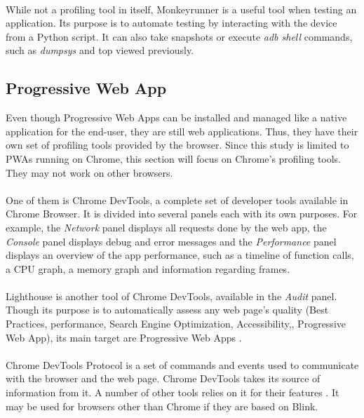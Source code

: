 \documentclass{kththesis}
\begin{document}
\paragraph{}
While not a profiling tool in itself, Monkeyrunner \cite{monkeyrunner} is a useful tool when testing an application. Its purpose is to automate testing by interacting with the device from a Python script. It can also take snapshots or execute \textit{adb shell} commands, such as \textit{dumpsys} and top viewed previously. 

\subsection{Progressive Web App}

Even though Progressive Web Apps can be installed and managed like a native application for the end-user, they are still web applications. Thus, they have their own set of profiling tools provided by the browser. Since this study is limited to PWAs running on Chrome, this section will focus on Chrome's profiling tools. They may not work on other browsers.

\paragraph{}
One of them is Chrome DevTools, a complete set of developer tools available in Chrome Browser. It is divided into several panels each with its own purposes. For example, the \textit{Network} panel displays all requests done by the web app, the \textit{Console} panel displays debug and error messages and the \textit{Performance} panel \cite{chrome_devtools_perf} displays an overview of the app performance, such as a timeline of function calls, a CPU graph, a memory graph and information regarding frames. 

\paragraph{}
Lighthouse \cite{lighthouse} is another tool of Chrome DevTools, available in the \textit{Audit} panel. Though its purpose is to automatically assess any web page's quality (Best Practices, performance, Search Engine Optimization, Accessibility,, Progressive Web App), its main target are Progressive Web Apps \cite{PWApossibleUnifer}. 

\paragraph{}
Chrome DevTools Protocol \cite{CDP} is a set of commands and events used to communicate with the browser and the web page. Chrome DevTools takes its source of information from it. A number of other tools relies on it for their features \cite{awesome_CDP}. It may be used for browsers other than Chrome if they are based on Blink.
\end{document}
